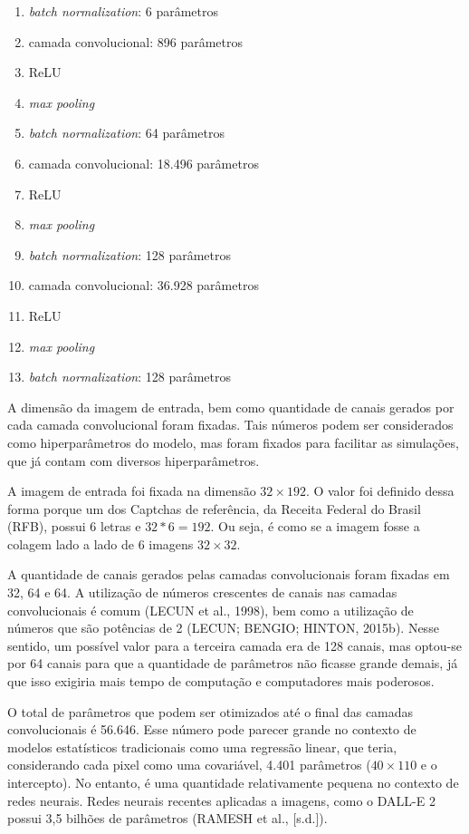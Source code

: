 \documentclass[12pt,twoside,brazilian]{book}
\providecommand{\tightlist}{%
  \setlength{\itemsep}{0pt}\setlength{\parskip}{0pt}}
\begin{document}
\begin{enumerate}
\def\labelenumi{\arabic{enumi}.}
\tightlist
\item
  \emph{batch normalization}: 6 parâmetros
\item
  camada convolucional: 896 parâmetros
\item
  ReLU
\item
  \emph{max pooling}
\item
  \emph{batch normalization}: 64 parâmetros
\item
  camada convolucional: 18.496 parâmetros
\item
  ReLU
\item
  \emph{max pooling}
\item
  \emph{batch normalization}: 128 parâmetros
\item
  camada convolucional: 36.928 parâmetros
\item
  ReLU
\item
  \emph{max pooling}
\item
  \emph{batch normalization}: 128 parâmetros
\end{enumerate}

A dimensão da imagem de entrada, bem como quantidade de canais gerados
por cada camada convolucional foram fixadas. Tais números podem ser
considerados como hiperparâmetros do modelo, mas foram fixados para
facilitar as simulações, que já contam com diversos hiperparâmetros.

A imagem de entrada foi fixada na dimensão \(32\times192\). O valor foi
definido dessa forma porque um dos Captchas de referência, da Receita
Federal do Brasil (RFB), possui 6 letras e \(32*6=192\). Ou seja, é como
se a imagem fosse a colagem lado a lado de 6 imagens \(32\times32\).

A quantidade de canais gerados pelas camadas convolucionais foram
fixadas em 32, 64 e 64. A utilização de números crescentes de canais nas
camadas convolucionais é comum (LECUN et al., 1998), bem como a
utilização de números que são potências de 2 (LECUN; BENGIO; HINTON,
2015b). Nesse sentido, um possível valor para a terceira camada era de
128 canais, mas optou-se por 64 canais para que a quantidade de
parâmetros não ficasse grande demais, já que isso exigiria mais tempo de
computação e computadores mais poderosos.

O total de parâmetros que podem ser otimizados até o final das camadas
convolucionais é 56.646. Esse número pode parecer grande no contexto de
modelos estatísticos tradicionais como uma regressão linear, que teria,
considerando cada pixel como uma covariável, 4.401 parâmetros
(\(40\times110\) e o intercepto). No entanto, é uma quantidade
relativamente pequena no contexto de redes neurais. Redes neurais
recentes aplicadas a imagens, como o DALL-E 2 possui 3,5 bilhões de
parâmetros (RAMESH et al., {[}s.d.{]}).
\end{document}
